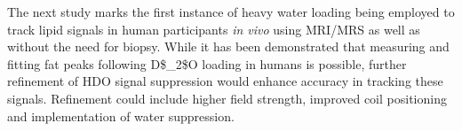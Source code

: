The next study marks the first instance of heavy water loading being employed to track lipid signals in human participants \textit{in vivo} using \ac{MRI}/\ac{MRS} as well as without the need for biopsy. While it has been demonstrated that measuring and fitting fat peaks following \ac{D$_2$O} loading in humans is possible, further refinement of \ac{HDO} signal suppression would enhance accuracy in tracking these signals. Refinement could include higher field strength, improved coil positioning and implementation of water suppression. 


% 